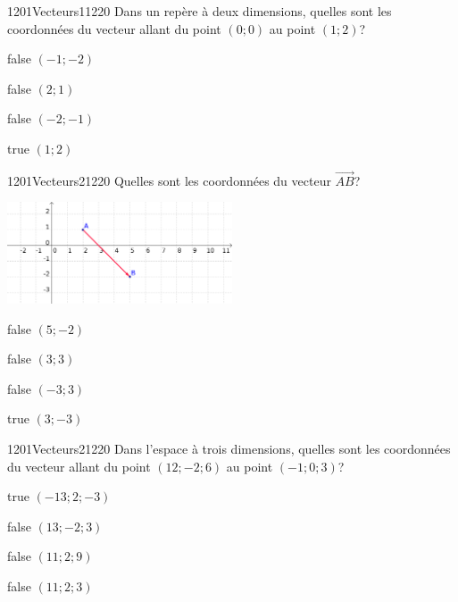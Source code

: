         	\begin{question}{1201}{Vecteurs}{1}{1220}
				Dans un repère à deux dimensions, quelles sont les coordonnées du vecteur allant du point $(0;0)$ au point $(1;2)$?
            \end{question}
            \begin{reponses}
            	\item[false] $(-1;-2)$
            	\item[false] $(2;1)$
                \item[false] $(-2;-1)$
                \item[true] $(1;2)$
            \end{reponses}
            \begin{question}{1201}{Vecteurs}{2}{1220}
                Quelles sont les coordonnées du vecteur $\vec{AB}$?
                \begin{center}
                	\includegraphics[width=0.5\textwidth]{Philippe/Figures_Philippe/vecteurs_4_3.png}
                \end{center}
            \end{question}
            \begin{reponses}
                \item[false] $(5;-2)$
                \item[false] $(3;3)$
                \item[false] $(-3;3)$
                \item[true] $(3;-3)$ 
            \end{reponses}
            \begin{question}{1201}{Vecteurs}{2}{1220}
                Dans l'espace à trois dimensions, quelles sont les coordonnées du vecteur allant du point $(12;-2;6)$ au point $(-1;0;3)$?
            \end{question}
            \begin{reponses}
                \item[true] $(-13;2;-3)$
                \item[false] $(13;-2;3)$
                \item[false] $(11;2;9)$
                \item[false] $(11;2;3)$
            \end{reponses}
